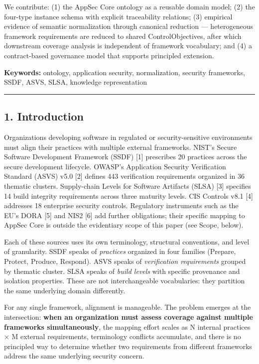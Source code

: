 \documentclass[
]{article}
\begin{document}
We contribute: (1) the AppSec Core ontology as a reusable domain model;
(2) the four-type instance schema with explicit traceability relations;
(3) empirical evidence of semantic normalization through canonical
reduction --- heterogeneous framework requirements are reduced to shared
ControlObjectives, after which downstream coverage analysis is
independent of framework vocabulary; and (4) a contract-based governance
model that supports principled extension.

\textbf{Keywords:} ontology, application security, normalization,
security frameworks, SSDF, ASVS, SLSA, knowledge representation

\begin{center}\rule{0.5\linewidth}{0.5pt}\end{center}

\subsection{1. Introduction}\label{introduction}

Organizations developing software in regulated or security-sensitive
environments must align their practices with multiple external
frameworks. NIST's Secure Software Development Framework (SSDF) {[}1{]}
prescribes 20 practices across the secure development lifecycle. OWASP's
Application Security Verification Standard (ASVS) v5.0 {[}2{]} defines
443 verification requirements organized in 36 thematic clusters.
Supply-chain Levels for Software Artifacts (SLSA) {[}3{]} specifies 14
build integrity requirements across three maturity levels. CIS Controls
v8.1 {[}4{]} addresses 18 enterprise security controls. Regulatory
instruments such as the EU's DORA {[}5{]} and NIS2 {[}6{]} add further
obligations; their specific mapping to AppSec Core is outside the
evidentiary scope of this paper (see Scope, below).

Each of these sources uses its own terminology, structural conventions,
and level of granularity. SSDF speaks of \emph{practices} organized in
four families (Prepare, Protect, Produce, Respond). ASVS speaks of
\emph{verification requirements} grouped by thematic cluster. SLSA
speaks of \emph{build levels} with specific provenance and isolation
properties. These are not interchangeable vocabularies: they partition
the same underlying domain differently.

For any single framework, alignment is manageable. The problem emerges
at the intersection: \textbf{when an organization must assess coverage
against multiple frameworks simultaneously}, the mapping effort scales
as N internal practices × M external requirements, terminology conflicts
accumulate, and there is no principled way to determine whether two
requirements from different frameworks address the same underlying
security concern.
\end{document}
